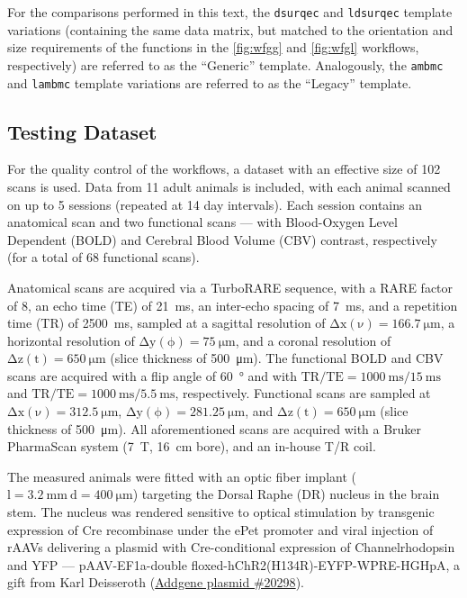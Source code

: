 For the comparisons performed in this text, the \textcolor{mg}{\texttt{dsurqec}} and \textcolor{mg}{\texttt{ldsurqec}} template variations (containing the same data matrix, but matched to the orientation and size requirements of the functions in the \cref{fig:wfgg} and \cref{fig:wfgl} workflows, respectively) are referred to as the “Generic” template.
Analogously, the \textcolor{mg}{\texttt{ambmc}} and \textcolor{mg}{\texttt{lambmc}} template variations are referred to as the “Legacy” template.

\subsection{Testing Dataset}

For the quality control of the workflows, a dataset with an effective size of 102 scans is used.
Data from 11 adult animals is included, with each animal scanned on up to 5 sessions (repeated at 14 day intervals).
Each session contains an anatomical scan and two functional scans --- with Blood-Oxygen Level Dependent (BOLD) \cite{Ogawa1990} and Cerebral Blood Volume (CBV) \cite{Marota1999} contrast, respectively (for a total of 68 functional scans).

Anatomical scans are acquired via a TurboRARE sequence, with a RARE factor of 8, an echo time (TE) of \SI{21}{\milli\second}, an inter-echo spacing of \SI{7}{\milli\second}, and a repetition time (TR) of \SI{2500}{\milli\second}, sampled at a sagittal resolution of $\mathrm{\Delta x(\nu)=\SI{166.7}{\micro\meter}}$, a horizontal resolution of $\mathrm{\Delta y(\phi)=\SI{75}{\micro\meter}}$, and a coronal resolution of $\mathrm{\Delta z(t)=\SI{650}{\micro\meter}}$ (slice thickness of \SI{500}{\micro\meter}).
The functional BOLD and CBV scans are acquired with a flip angle of \SI{60}{\degree} and with $\mathrm{TR/TE = \SI{1000}{\milli\second}/\SI{15}{\milli\second}}$ and $\mathrm{TR/TE = \SI{1000}{\milli\second}/\SI{5.5}{\milli\second}}$, respectively.
Functional scans are sampled at $\mathrm{\Delta x(\nu)=\SI{312.5}{\micro\meter}}$, $\mathrm{\Delta y(\phi)=\SI{281.25}{\micro\meter}}$, and $\mathrm{\Delta z(t)=\SI{650}{\micro\meter}}$ (slice thickness of \SI{500}{\micro\meter}).
All aforementioned scans are acquired with a Bruker PharmaScan system (\SI{7}{\tesla}, \SI{16}{\centi\meter} bore), and an in-house T/R coil.

The measured animals were fitted with an optic fiber implant ($\mathrm{l=\SI{3.2}{\milli\meter} \ d=\SI{400}{\micro\meter}}$) targeting the Dorsal Raphe (DR) nucleus in the brain stem.
The nucleus was rendered sensitive to optical stimulation by transgenic expression of Cre recombinase under the ePet promoter \cite{Scott2005} and viral injection of rAAVs delivering a plasmid with Cre-conditional expression of Channelrhodopsin and YFP ---
pAAV-EF1a-double floxed-hChR2(H134R)-EYFP-WPRE-HGHpA, a gift from Karl Deisseroth (\href{https://www.addgene.org/20298/}{Addgene plasmid \#20298}).

